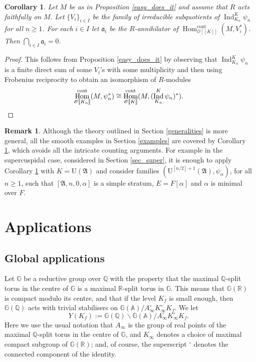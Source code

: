 \documentclass[JEP,XML,SOM,Unicode,NoEqCountersInSection]{cedram}
\let\mathcal\mathscr
\newtheorem{cor}[prop]{Corollary}
\theoremstyle{definition}
\newtheorem{remark}[prop]{Remark}
\DeclareMathOperator{\Hom}{Hom}
\DeclareMathOperator{\Ind}{Ind}
\newcommand{\br}[1]{[\![#1]\!]}
\newcommand{\Aa}{\mathfrak A}
\newcommand{\cO}{\mathcal{O}}
\newcommand{\cont}{\mathrm{cont}}
\newcommand{\UU}{\mathrm U}
\begin{document}
\begin{cor}\label{easy} Let
$M$ be as in Proposition \ref{easy_does_it} and assume that $R$ acts faithfully on $M$. Let $\{ V_i\}_{i\in I}$ be the family of irreducible subquotients of $\Ind_{K_n}^K \psi_n$ for all $n\ge 1$. For each $i\in I$ let $\mathfrak a_i$ be the $R$-annihilator of
$\Hom_{\cO\br{K}}^{\cont}(M, V_i^*)$. Then $\bigcap_{i\in I} \mathfrak a _i=0$.
\end{cor}

\begin{proof} This follows from Proposition \ref{easy_does_it} by observing that $\Ind_{K_n}^K \psi_n$ is a finite direct
sum of some $V_i$'s with some multiplicity and then using Frobenius reciprocity to obtain an isomorphism of $R$-modules
\[
\Hom^{\cont}_{\cO\br{K_n}}(M, \psi_n^*)\cong \Hom_{\cO\br{K}}^{\cont}(M, (\Ind_{K_n}^K \psi_n)^*).\qedhere
\]
\end{proof}

\begin{remark} Although the theory outlined in Section \ref{generalities} is more general,
all the smooth examples in Section \ref{examples} are covered by Corollary \ref{easy},
which avoids all the intricate counting arguments. For example in the supercuspidal case,
considered in Section \ref{sec_super}, it is enough to apply Corollary \ref{easy} with $K=\UU(\Aa)$ and
consider families $(\UU^{[n/2]+1}(\Aa), \psi_{\alpha})$, for all $n\ge 1$, such that $[\Aa, n, 0, \alpha]$
is a simple stratum, $E=F[\alpha]$ and $\alpha$ is minimal over $F$.
\end{remark}

\section{Applications}\label{sec_appl}

\subsection{Global applications}\label{global}

Let $\mathbb G$ be a reductive group over $\mathbb Q$ with the property
that the maximal $\mathbb Q$-split torus in the centre
of $\mathbb G$ is a maximal $\mathbb R$-split torus in $\mathbb G$.
This means that $\mathbb G(\mathbb R)$ is compact modulo its centre,
and that if the level $K_f$ is small enough, then
$\mathbb G(\mathbb Q)$ acts with trivial stabilisers
on $\mathbb G(\mathbb A)/A_{\infty}^{\circ} K_{\infty}^{\circ} K_f.$ We
let
\[
Y(K_f):= \mathbb G(\mathbb Q)\backslash\mathbb G(\mathbb A)/A_{\infty}^{\circ} K_{\infty}^{\circ} K_f.
\]
Here we use the usual notation that $A_{\infty}$ is the group
of real points of the maximal $\mathbb Q$\nobreakdash-split torus in the
centre of $\mathbb G$, and $K_{\infty}$ denotes
a choice of maximal compact subgroup of $\mathbb G(\mathbb R)$;
and, of course, the superscript ${}^{\circ}$ denotes the connected
component of the identity.
\end{document}
